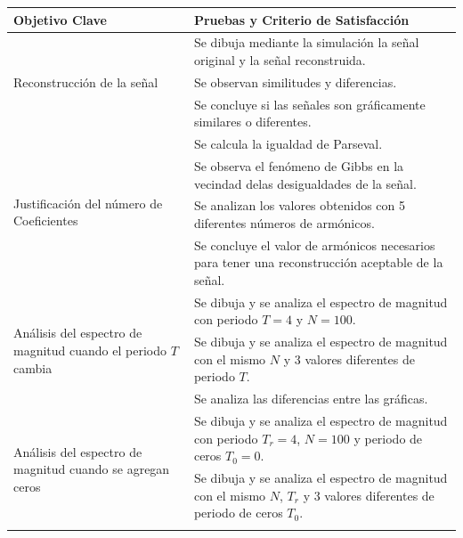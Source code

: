 \documentclass[12pt]{article}
\begin{document}
        \begin{table}[H]
            \begin{center}
                \begin{tabular}{| m{5cm} | m{12cm} |}
                    \hline
                    \textbf{Objetivo Clave} & \textbf{Pruebas y Criterio de Satisfacción} \\ \hline
                    \multirow{3}{4.5cm}{Reconstrucción de la señal} 
                        & Se dibuja mediante la simulación la señal original y la señal reconstruida. \\ \cline{2-2} 
                        & Se observan similitudes y diferencias. \\ \cline{2-2}
                        & Se concluye si las señales son gráficamente similares o diferentes. \\ \hline
                    \multirow{4}{4.5cm}{Justificación del número de Coeficientes}
                        & Se calcula la igualdad de Parseval. \\ \cline{2-2} 
                        & Se observa el fenómeno de Gibbs en la vecindad delas desigualdades de la señal. \\ \cline{2-2}
                        & Se analizan los valores obtenidos con 5 diferentes números de armónicos. \\ \cline{2-2}
                        & Se concluye el valor de armónicos necesarios para tener una reconstrucción 
                        aceptable de la señal. \\ \hline
                    \multirow{3}{4.5cm}{Análisis del espectro de magnitud cuando el periodo $T$ cambia}
                        & Se dibuja y se analiza el espectro de magnitud con periodo $T=4$ y $N=100$. \\ \cline{2-2}
                        & Se dibuja y se analiza el espectro de magnitud con el mismo $N$ y 3 valores diferentes 
                        de periodo $T$. \\ \cline{2-2}
                        & Se analiza las diferencias entre las gráficas. \\ \hline
                    \multirow{3}{4.5cm}{Análisis del espectro de magnitud cuando se agregan ceros}
                        & Se dibuja y se analiza el espectro de magnitud con periodo $T_r=4$, $N=100$ y periodo de ceros $T_0=0$. \\ \cline{2-2}
                        & Se dibuja y se analiza el espectro de magnitud con el mismo $N$, $T_r$ y 3 valores diferentes de periodo de ceros $T_0$. \\ \cline{2-2}

\end{tabular}
\end{center}
\end{table}
\end{document}
